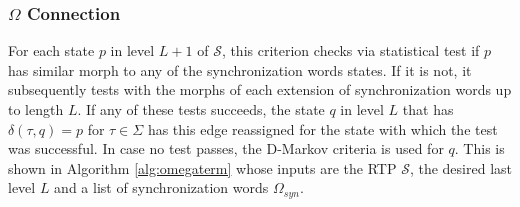 {%
\subsubsection{$\Omega$ Connection}


For each state $p$ in level $L+1$ of $\mathcal{S}$, this criterion checks via statistical test if $p$ has similar morph to any of the synchronization words states. If it is not, it subsequently tests with the morphs of each extension of synchronization words up to length $L$. If any of these tests succeeds, the state $q$ in level $L$ that has $\delta(\tau,q) = p$ for $\tau \in \Sigma$ has this edge reassigned for the state with which the test was successful. In case no test passes, the D-Markov criteria is used for $q$. This is shown in Algorithm \ref{alg:omegaterm} whose inputs are the RTP $\mathcal{S}$, the desired last level $L$ and a list of synchronization words $\Omega_{syn}$.  

}
